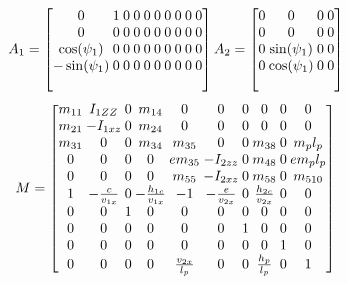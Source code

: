 \begin{equation}
\setlength{\arraycolsep}{1.2pt}
A_1 = \begin{bmatrix}
0 & 1 & 0 & 0 & 0 & 0 & 0 & 0 & 0 & 0 \\
0 & 0 & 0 & 0 & 0 & 0 & 0 & 0 & 0 & 0 \\
\cos(\psi_1) & 0 & 0 & 0 & 0 & 0 & 0 & 0 & 0 & 0 \\
-\sin(\psi_1) & 0 & 0 & 0 & 0 & 0 & 0 & 0 & 0 & 0 \\\nonumber
\end{bmatrix}
\setlength{\arraycolsep}{1.2pt}
A_2 = \begin{bmatrix}
0 & 0 & 0 & 0 \\
0 & 0 & 0 & 0 \\
0 & \sin(\psi_1) & 0 & 0 \\
0 & \cos(\psi_1) & 0 & 0 \\\nonumber
\end{bmatrix}
\end{equation}
\vspace{-0.2cm}
\begin{equation}
\setlength{\arraycolsep}{1.2pt}
M = \begin{bmatrix}
m_{11} & I_{1ZZ} & 0 & m_{14} & 0 & 0 & 0 & 0 & 0 & 0 \\ 
m_{21} & {- I_{1xz}} & 0 & m_{24} & 0 & 0 & 0 & 0 & 0 & 0 \\
m_{31} & 0 & 0 & m_{34} & m_{35} & 0 & 0 & m_{38} & 0 & {m_{p}l_{p}} \\
0 & 0 & 0 & 0 & {em_{35}} & {- I_{2zz}} & 0 & m_{48} & 0 & {em_{p}l_{p}} \\
0 & 0 & 0 & 0 & m_{55} & {- I_{2xz}} & 0 & m_{58} & 0 & m_{510} \\
1 & {- \frac{c}{v_{1x}}} & 0 & {- \frac{h_{1c}}{v_{1x}}} & {- 1} & {- \frac{e}{v_{2x}}} & 0 & \frac{h_{2c}}{v_{2x}} & 0 & 0 \\
0 & 0 & 1 & 0 & 0 & 0 & 0 & 0 & 0 & 0 \\
0 & 0 & 0 & 0 & 0 & 0 & 1 & 0 & 0 & 0 \\
0 & 0 & 0 & 0 & 0 & 0 & 0 & 0 & 1 & 0 \\
0 & 0 & 0 & 0 & \frac{v_{2x}}{l_{p}} & 0 & 0 & \frac{h_{p}}{l_{p}} & 0 & 1
\end{bmatrix}\nonumber
\end{equation}
\vspace{-0.3cm}
